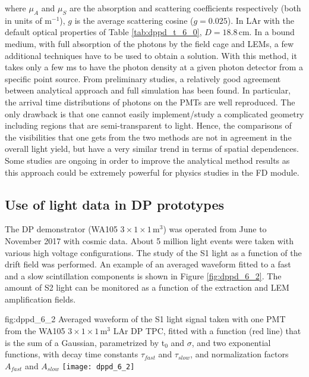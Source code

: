 where $\mu_A$ and $\mu_S$ are the absorption and scattering coefficients respectively (both in units of m$^{-1}$), $g$ is the average scattering cosine ($g = 0.025$). In LAr with the default optical properties of Table \ref{tab:dppd_t_6_0}, $D = 18.8$\,cm. In a bound medium, with full absorption of the photons by the field cage and LEMs, a few additional techniques have to be used to obtain a solution. With this method, it takes only a few ms to have the photon density at a given photon detector from a specific point source. From preliminary studies, a relatively good agreement between analytical approach and full simulation has been found. In particular, the arrival time distributions of photons on the PMTs are well reproduced. The only drawback is that one cannot easily implement/study a complicated geometry including regions that are semi-transparent to light. Hence, the comparisons of the visibilities that one gets from the two methods are not in agreement in the overall light yield, but have a very similar trend in terms of spatial dependences. Some studies are ongoing in order to improve the analytical method results as this approach could be extremely powerful for physics studies in the FD module.


\subsection{Use of light data in DP prototypes}
\label{sec:fddp-pd-6.2}

The DP demonstrator (WA105 $3\times1\times1$\,m$^3$) was operated from June to November 2017 with cosmic data. About 5 million light events were taken with various high voltage configurations. The study of the S1 light as a function of the drift field was performed. An example of an averaged waveform fitted to a fast and a slow scintillation components is shown in Figure \ref{fig:dppd_6_2}. The amount of S2 light can be monitored as a function of the extraction and LEM amplification fields.

\begin{dunefigure}[]{fig:dppd_6_2}
{Averaged waveform of the S1 light signal taken with one PMT from the WA105 $3\times1\times1$\,m$^3$ LAr DP TPC, fitted with a function (red line) that is the sum of a Gaussian, parametrized by t$_0$ and $\sigma$, and two exponential functions, with decay time constants $\tau_{fast}$ and $\tau_{slow}$, and normalization factors $A_{fast}$ and $A_{slow}$}
\texttt{[image: dppd\_6\_2]}
\end{dunefigure}

